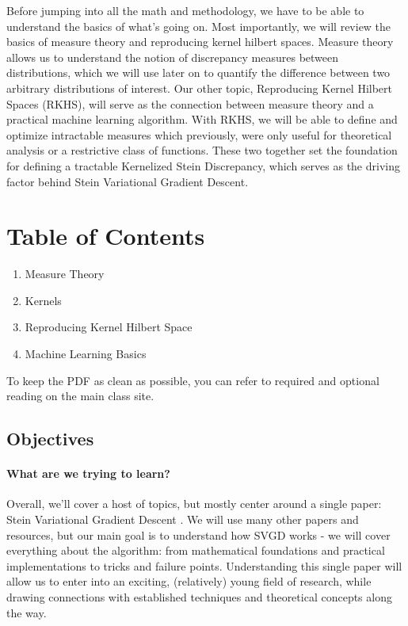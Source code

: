 \documentclass[12pt]{article}
\begin{document}
	\MakeScribeTop


Before jumping into all the math and methodology, we have to be able to  understand the basics of what’s going on. Most importantly, we will review the basics of measure theory and reproducing kernel hilbert spaces. Measure theory allows us to understand the notion of discrepancy measures between distributions, which we will use later on to quantify the difference between two arbitrary distributions of interest. Our other topic, Reproducing Kernel Hilbert Spaces (RKHS), will serve as the connection between measure theory and a practical machine learning algorithm. With RKHS, we will be able to define and optimize intractable measures which previously, were only useful for theoretical analysis or a restrictive class of functions. These two together set the foundation for defining a tractable Kernelized Stein Discrepancy, which serves as the driving factor behind Stein Variational Gradient Descent. 

\section{Table of Contents}

\begin{enumerate}
    \item Measure Theory
    \item Kernels
    \item Reproducing Kernel Hilbert Space
    \item Machine Learning Basics 

\end{enumerate}

To keep the PDF as clean as possible, you can refer to required and optional reading on the main class site.

\subsection{Objectives}

\paragraph{What are we trying to learn?} Overall, we'll cover a host of topics, but mostly center around a single paper: Stein Variational Gradient Descent \cite{liu2016stein}. We will use many other papers and resources, but our main goal is to understand how SVGD works - we will cover everything about the algorithm: from mathematical foundations and practical implementations to tricks and failure points. Understanding this single paper will allow us to enter into an exciting, (relatively) young field of research, while drawing connections with established techniques and theoretical concepts along the way. 
\end{document}
